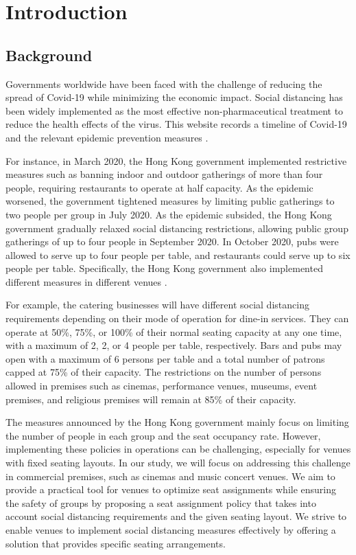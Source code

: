\section{Introduction}

\subsection{Background}
Governments worldwide have been faced with the challenge of reducing the spread of Covid-19 while minimizing the economic impact. Social distancing has been widely implemented as the most effective non-pharmaceutical treatment to reduce the health effects of the virus. This website records a timeline of Covid-19 and the relevant epidemic prevention measures \cite{Covid19Timeline}. 

For instance, in March 2020, the Hong Kong government implemented restrictive measures such as banning indoor and outdoor gatherings of more than four people, requiring restaurants to operate at half capacity. As the epidemic worsened, the government tightened measures by limiting public gatherings to two people per group in July 2020. As the epidemic subsided, the Hong Kong government gradually relaxed social distancing restrictions, allowing public group gatherings of up to four people in September 2020. In October 2020, pubs were allowed to serve up to four people per table, and restaurants could serve up to six people per table. Specifically, the Hong Kong government also implemented different measures in different venues \cite{Gov202209}.

For example, the catering businesses will have different social distancing requirements depending on their mode of operation for dine-in services. They can operate at 50\%, 75\%, or 100\% of their normal seating capacity at any one time, with a maximum of 2, 2, or 4 people per table, respectively. Bars and pubs may open with a maximum of 6 persons per table and a total number of patrons capped at 75\% of their capacity. The restrictions on the number of persons allowed in premises such as cinemas, performance venues, museums, event premises, and religious premises will remain at 85\% of their capacity.

The measures announced by the Hong Kong government mainly focus on limiting the number of people in each group and the seat occupancy rate. However, implementing these policies in operations can be challenging, especially for venues with fixed seating layouts. In our study, we will focus on addressing this challenge in commercial premises, such as cinemas and music concert venues. We aim to provide a practical tool for venues to optimize seat assignments while ensuring the safety of groups by proposing a seat assignment policy that takes into account social distancing requirements and the given seating layout. We strive to enable venues to implement social distancing measures effectively by offering a solution that provides specific seating arrangements.


